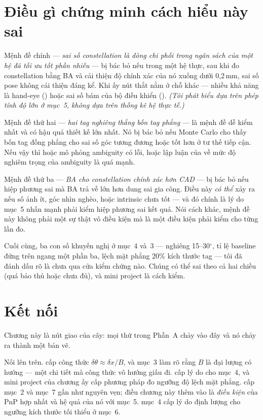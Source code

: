 \documentclass[../../marker.tex]{subfiles}
\begin{document}
\section{Điều gì chứng minh cách hiểu này sai}

Mệnh đề chính --- \emph{sai số constellation là dòng chi phối trong ngân sách của một hệ đã tối ưu tốt phần nhiễu} --- bị bác bỏ nếu trong một hệ thực, sau khi đo constellation bằng BA và cải thiện độ chính xác của nó xuống dưới 0,2\,mm, sai số pose không cải thiện đáng kể. Khi ấy nút thắt nằm ở chỗ khác --- nhiều khả năng là hand-eye () hoặc sai số bám của bộ điều khiển (). \emph{(Tôi phát biểu dựa trên phép tính độ lớn ở mục~5, không dựa trên thống kê hệ thực tế.)}

Mệnh đề thứ hai --- \emph{hai tag nghiêng thắng bốn tag phẳng} --- là mệnh đề dễ kiểm nhất và có hậu quả thiết kế lớn nhất. Nó bị bác bỏ nếu Monte Carlo cho thấy bốn tag đồng phẳng cho sai số góc tương đương hoặc tốt hơn ở tư thế tiếp cận. Nếu vậy thì hoặc mô phỏng ambiguity có lỗi, hoặc lập luận của  về mức độ nghiêm trọng của ambiguity là quá mạnh.

Mệnh đề thứ ba --- \emph{BA cho constellation chính xác hơn CAD} --- bị bác bỏ nếu hiệp phương sai mà BA trả về lớn hơn dung sai gia công. Điều này \emph{có thể} xảy ra nếu số ảnh ít, góc nhìn nghèo, hoặc intrinsic chưa tốt --- và đó chính là lý do mục~5 nhấn mạnh phải kiểm hiệp phương sai kết quả. Nói cách khác, mệnh đề này không phải một sự thật vô điều kiện mà là một điều kiện phải kiểm cho từng lần đo.

Cuối cùng, ba con số khuyến nghị ở mục~4 và~3 --- nghiêng 15--30\(^\circ\), tỉ lệ baseline đứng trên ngang một phần ba, lệch mặt phẳng 20\% kích thước tag --- tôi đã đánh dấu rõ là chưa qua cửa kiểm chứng nào. Chúng có thể sai theo cả hai chiều (quá bảo thủ hoặc chưa đủ), và mini project là cách kiểm.

\section{Kết nối}

Chương này là nút giao của cây: mọi thứ trong Phần~A chảy vào đây và nó chảy ra thành một bản vẽ.

Nối lên trên.  cấp công thức \(\delta\theta \approx \delta x/B\), và mục~3 làm rõ rằng \(B\) là đại lượng có hướng --- một chi tiết mà công thức vô hướng giấu đi.  cấp lý do cho mục~4, và mini project của chương ấy cấp phương pháp đo ngưỡng độ lệch mặt phẳng.  cấp mục~2 và mục~7 gần như nguyên vẹn; điều chương này thêm vào là \emph{điều kiện} của PnP hợp nhất và hệ quả của nó với mục~5.  mục~4 cấp lý do định lượng cho ngưỡng kích thước tối thiểu ở mục~6.
\end{document}
